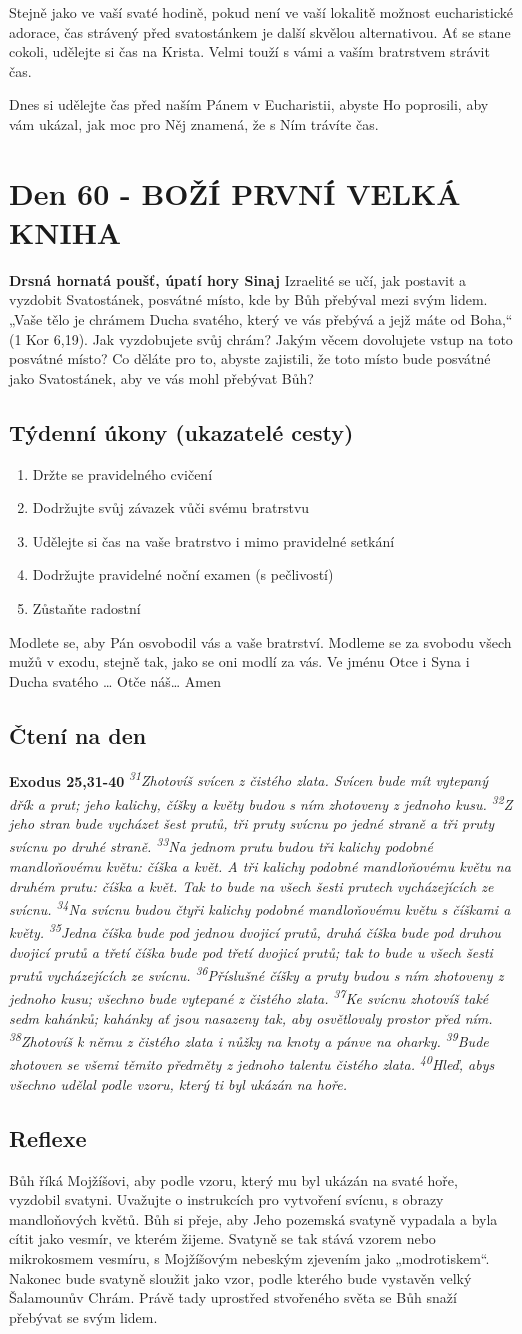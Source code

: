 \documentclass[11pt]{article}
\newcommand{\zacatekDevatyTyden}{
\textbf{Drsná hornatá poušť, úpatí hory Sinaj} \newline 
Izraelité se učí, jak postavit a vyzdobit Svatostánek, posvátné místo, kde by Bůh přebýval mezi svým lidem. „Vaše tělo je chrámem Ducha svatého, který ve vás přebývá a jejž máte od Boha,“ (1 Kor 6,19). Jak vyzdobujete svůj chrám? Jakým věcem dovolujete vstup na toto posvátné místo? Co děláte pro to, abyste zajistili, že toto místo bude posvátné jako Svatostánek, aby ve vás mohl přebývat Bůh?

\subsection*{Týdenní úkony (ukazatelé cesty)}
\begin{enumerate}
  \item Držte se pravidelného cvičení
  \item Dodržujte svůj závazek vůči svému bratrstvu
  \item Udělejte si čas na vaše bratrstvo i mimo pravidelné setkání
  \item Dodržujte pravidelné noční examen (s pečlivostí)
  \item Zůstaňte radostní
\end{enumerate}
Modlete se, aby Pán osvobodil vás a vaše bratrství. \newline
Modleme se za svobodu všech mužů v exodu, stejně tak, jako se oni modlí za vás.\newline
Ve jménu Otce i Syna i Ducha svatého …  Otče náš… Amen
}
\begin{document}
Stejně jako ve vaší svaté hodině, pokud není ve vaší lokalitě možnost eucharistické adorace, čas strávený před svatostánkem je
další skvělou alternativou. Ať se stane cokoli, udělejte si čas na Krista. Velmi touží s vámi a vaším bratrstvem strávit čas.

Dnes si udělejte čas před naším Pánem v Eucharistii, abyste Ho poprosili, aby vám ukázal, jak moc pro Něj znamená, že s Ním
trávíte čas.


\newpage
\section{Den 60 - BOŽÍ PRVNÍ VELKÁ KNIHA}
\zacatekDevatyTyden
\subsection*{Čtení na den}
\textbf{Exodus 25,31-40}
\newline
\textit{
\textsuperscript{31}Zhotovíš svícen z čistého zlata. Svícen bude mít vytepaný dřík a prut; jeho kalichy, číšky a květy budou s ním zhotoveny z jednoho kusu.
\textsuperscript{32}Z jeho stran bude vycházet šest prutů, tři pruty svícnu po jedné straně a tři pruty svícnu po druhé straně.
\textsuperscript{33}Na jednom prutu budou tři kalichy podobné mandloňovému květu: číška a květ. A tři kalichy podobné mandloňovému květu na druhém prutu: číška a květ. Tak to bude na všech šesti prutech vycházejících ze svícnu.
\textsuperscript{34}Na svícnu budou čtyři kalichy podobné mandloňovému květu s číškami a květy.
\textsuperscript{35}Jedna číška bude pod jednou dvojicí prutů, druhá číška bude pod druhou dvojicí prutů a třetí číška bude pod třetí dvojicí prutů; tak to bude u všech šesti prutů vycházejících ze svícnu.
\textsuperscript{36}Příslušné číšky a pruty budou s ním zhotoveny z jednoho kusu; všechno bude vytepané z čistého zlata.
\textsuperscript{37}Ke svícnu zhotovíš také sedm kahánků; kahánky ať jsou nasazeny tak, aby osvětlovaly prostor před ním.
\textsuperscript{38}Zhotovíš k němu z čistého zlata i nůžky na knoty a pánve na oharky.
\textsuperscript{39}Bude zhotoven se všemi těmito předměty z jednoho talentu čistého zlata.
\textsuperscript{40}Hleď, abys všechno udělal podle vzoru, který ti byl ukázán na hoře.
}

\subsection*{Reflexe}
Bůh říká Mojžíšovi, aby podle vzoru, který mu byl ukázán na svaté hoře, vyzdobil svatyni. Uvažujte o instrukcích pro
vytvoření svícnu, s obrazy mandloňových květů. Bůh si přeje, aby Jeho pozemská svatyně vypadala a byla cítit jako
vesmír, ve kterém žijeme. Svatyně se tak stává vzorem nebo mikrokosmem vesmíru, s Mojžíšovým nebeským
zjevením jako „modrotiskem“. Nakonec bude svatyně sloužit jako vzor, podle kterého bude vystavěn velký
Šalamounův Chrám. Právě tady uprostřed stvořeného světa se Bůh snaží přebývat se svým lidem.
\end{document}
